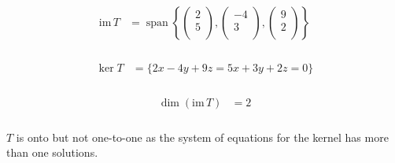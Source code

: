 \documentclass[fleqn, a4paper]{amsart}
\DeclareMathOperator{\vspan}{\mathrm{span}} %
\theoremstyle{definition}
\theoremstyle{theorem}
\theoremstyle{remark}
\newcommand{\im}{\mathrm{im}\,}
\numberwithin{corollary}{theorem}
\numberwithin{equation}{theorem}
\begin{document}
\begin{multicols}{1}
\subsubsection{}

\begin{align*}
	\im T &= \vspan
		\left\lbrace
			\begin{pmatrix}
				2\\
				5\\
			\end{pmatrix}
			,
			\begin{pmatrix}
				-4\\
				3\\
			\end{pmatrix}
			,
			\begin{pmatrix}
			9\\
			2\\
			\end{pmatrix}
		\right\rbrace
\end{align*}

\subsubsection{}

\begin{align*}
	\ker T &= \{2x - 4y + 9z = 5x + 3y + 2z = 0\}
\end{align*}

\subsubsection{}

\begin{align*}
	\dim (\im T) &= 2
\end{align*}

\subsubsection{}

$T$ is onto but not one-to-one as the system of equations for the kernel has more than one solutions.

\subsection{}


\end{multicols}
\end{document}
